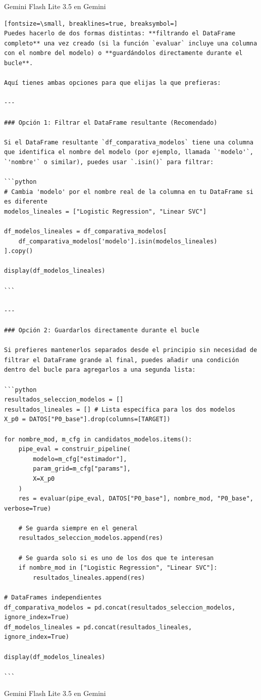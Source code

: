 \documentclass[12pt,a4paper,oneside]{book}
\begin{document}
\begin{iaresp}{Gemini Flash Lite 3.5 en Gemini}
\begin{Verbatim}[fontsize=\small, breaklines=true, breaksymbol=]
Puedes hacerlo de dos formas distintas: **filtrando el DataFrame completo** una vez creado (si la función `evaluar` incluye una columna con el nombre del modelo) o **guardándolos directamente durante el bucle**.

Aquí tienes ambas opciones para que elijas la que prefieras:

---

### Opción 1: Filtrar el DataFrame resultante (Recomendado)

Si el DataFrame resultante `df_comparativa_modelos` tiene una columna que identifica el nombre del modelo (por ejemplo, llamada `'modelo'`, `'nombre'` o similar), puedes usar `.isin()` para filtrar:

```python
# Cambia 'modelo' por el nombre real de la columna en tu DataFrame si es diferente
modelos_lineales = ["Logistic Regression", "Linear SVC"]

df_modelos_lineales = df_comparativa_modelos[
    df_comparativa_modelos['modelo'].isin(modelos_lineales)
].copy()

display(df_modelos_lineales)

```

---

### Opción 2: Guardarlos directamente durante el bucle

Si prefieres mantenerlos separados desde el principio sin necesidad de filtrar el DataFrame grande al final, puedes añadir una condición dentro del bucle para agregarlos a una segunda lista:

```python
resultados_seleccion_modelos = []
resultados_lineales = [] # Lista específica para los dos modelos
X_p0 = DATOS["P0_base"].drop(columns=[TARGET])

for nombre_mod, m_cfg in candidatos_modelos.items():
    pipe_eval = construir_pipeline(
        modelo=m_cfg["estimador"],
        param_grid=m_cfg["params"],
        X=X_p0
    )
    res = evaluar(pipe_eval, DATOS["P0_base"], nombre_mod, "P0_base", verbose=True)
    
    # Se guarda siempre en el general
    resultados_seleccion_modelos.append(res)
    
    # Se guarda solo si es uno de los dos que te interesan
    if nombre_mod in ["Logistic Regression", "Linear SVC"]:
        resultados_lineales.append(res)

# DataFrames independientes
df_comparativa_modelos = pd.concat(resultados_seleccion_modelos, ignore_index=True)
df_modelos_lineales = pd.concat(resultados_lineales, ignore_index=True)

display(df_modelos_lineales)

```
\end{Verbatim}
\end{iaresp}{Gemini Flash Lite 3.5 en Gemini}
\end{document}
